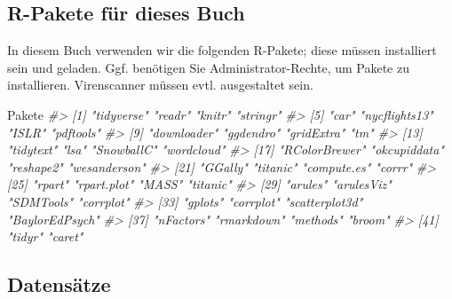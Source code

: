\documentclass[12pt,ngerman,]{book}
\makeatletter
\newenvironment{Shaded}{\begin{snugshade}}{\end{snugshade}}
\newcommand{\CommentTok}[1]{\textcolor[rgb]{0.56,0.35,0.01}{\textit{{#1}}}}
\newcommand{\NormalTok}[1]{{#1}}
\newenvironment{kframe}{%
\medskip{}
\setlength{\fboxsep}{.8em}
 \def\at@end@of@kframe{}%
 \ifinner\ifhmode%
  \def\at@end@of@kframe{\end{minipage}}%
  \begin{minipage}{\columnwidth}%
 \fi\fi%
 \def\FrameCommand##1{\hskip\@totalleftmargin \hskip-\fboxsep
 \colorbox{shadecolor}{##1}\hskip-\fboxsep
     \hskip-\linewidth \hskip-\@totalleftmargin \hskip\columnwidth}%
 \MakeFramed {\advance\hsize-\width
   \@totalleftmargin\z@ \linewidth\hsize
   \@setminipage}}%
 {\par\unskip\endMakeFramed%
 \at@end@of@kframe}
\renewenvironment{Shaded}{\begin{kframe}}{\end{kframe}}
\makeatother
\begin{document}
\subsection{R-Pakete für dieses Buch}\label{r-pakete-fur-dieses-buch}

In diesem Buch verwenden wir die folgenden R-Pakete; diese müssen
installiert sein und geladen. Ggf. benötigen Sie Administrator-Rechte,
um Pakete zu installieren. Virenscanner müssen evtl. ausgestaltet sein.

\begin{Shaded}
\begin{Highlighting}[]
\NormalTok{Pakete }
\CommentTok{#>  [1] "tidyverse"     "readr"         "knitr"         "stringr"      }
\CommentTok{#>  [5] "car"           "nycflights13"  "ISLR"          "pdftools"     }
\CommentTok{#>  [9] "downloader"    "ggdendro"      "gridExtra"     "tm"           }
\CommentTok{#> [13] "tidytext"      "lsa"           "SnowballC"     "wordcloud"    }
\CommentTok{#> [17] "RColorBrewer"  "okcupiddata"   "reshape2"      "wesanderson"  }
\CommentTok{#> [21] "GGally"        "titanic"       "compute.es"    "corrr"        }
\CommentTok{#> [25] "rpart"         "rpart.plot"    "MASS"          "titanic"      }
\CommentTok{#> [29] "arules"        "arulesViz"     "SDMTools"      "corrplot"     }
\CommentTok{#> [33] "gplots"        "corrplot"      "scatterplot3d" "BaylorEdPsych"}
\CommentTok{#> [37] "nFactors"      "rmarkdown"     "methods"       "broom"        }
\CommentTok{#> [41] "tidyr"         "caret"}
\end{Highlighting}
\end{Shaded}

\subsection{Datensätze}\label{daten}
\end{document}
